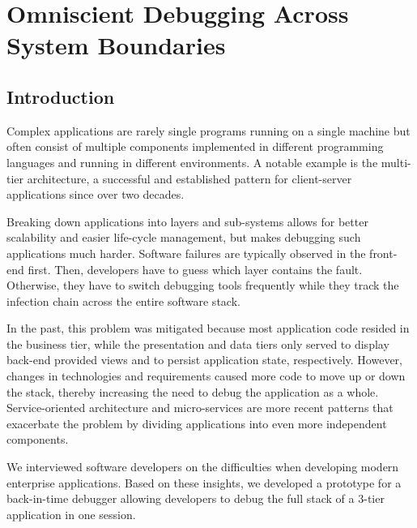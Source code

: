\chapter{Omniscient Debugging Across System Boundaries}
\label{sec:stack_odb}


%

\tmpStart

\section{Introduction}
\label{sec:introduction}

Complex applications are rarely single programs running on a single machine but often consist of multiple components implemented in different programming languages and running in different environments.
A notable example is the multi-tier architecture, a successful and established pattern for client-server applications since over two decades.

Breaking down applications into layers and sub-systems allows for better scalability and easier life-cycle management, but makes debugging such applications much harder.
Software failures are typically observed in the front-end first.
Then, developers have to guess which layer contains the fault. 
Otherwise, they have to switch debugging tools frequently while they track the infection chain across the entire software stack.

In the past, this problem was mitigated because most application code resided in the business tier, while the presentation and data tiers only served to display back-end provided views and to persist application state, respectively.
However, changes in technologies and requirements caused more code to move up or down the stack, thereby increasing the need to debug the application as a whole.
Service-oriented architecture and micro-services are more recent patterns that exacerbate the problem by dividing applications into even more independent components.

We interviewed software developers on the difficulties when developing modern enterprise applications.
Based on these insights, we developed a prototype for a back-in-time debugger allowing developers to debug the full stack of a 3-tier application in one session.

